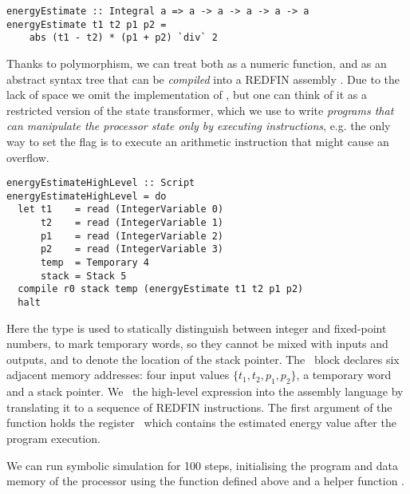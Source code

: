 
\vspace{-0.3mm}
\begin{verbatim}
energyEstimate :: Integral a => a -> a -> a -> a -> a
energyEstimate t1 t2 p1 p2 =
    abs (t1 - t2) * (p1 + p2) `div` 2
\end{verbatim}
\vspace{-0.5mm}

\noindent
Thanks to polymorphism, we can treat  both as a numeric
function, and as an abstract syntax tree that can be \emph{compiled} into a
REDFIN assembly . Due to the lack of space we omit the implementation
of , but one can think of it as a restricted version
of the  state transformer, which we use to write \emph{programs that
can manipulate the processor state only by executing instructions}, e.g. the
only way to set the  flag is to execute an arithmetic instruction
that might cause an overflow.

\begin{verbatim}
energyEstimateHighLevel :: Script
energyEstimateHighLevel = do
  let t1    = read (IntegerVariable 0)
      t2    = read (IntegerVariable 1)
      p1    = read (IntegerVariable 2)
      p2    = read (IntegerVariable 3)
      temp  = Temporary 4
      stack = Stack 5
  compile r0 stack temp (energyEstimate t1 t2 p1 p2)
  halt
\end{verbatim}
\label{energyEstimateHighLevel}

\noindent
Here the type  is used to statically distinguish between integer
and fixed-point numbers,  to mark temporary words, so they cannot
be mixed with inputs and outputs, and  to denote the location of the
stack pointer. The~ block declares six adjacent memory addresses: four
input values $\{t_1, t_2, p_1, p_2\}$, a temporary word and a stack pointer.
We~ the high-level expression  into the assembly
language by translating it to a sequence of REDFIN instructions. The first
argument of the~ function holds the register~ which contains
the estimated energy value after the program execution.

We can run symbolic simulation for 100 steps, initialising the program and data
memory of the processor using the function  defined above and a
helper function .

